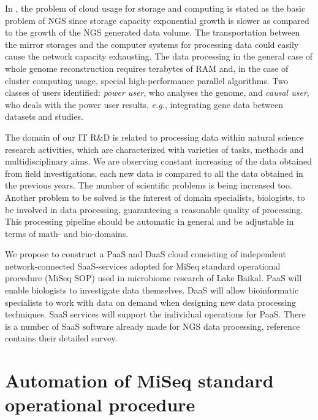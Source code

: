 \documentclass[a4paper]{jpconf}
\begin{document}
In \cite{guo16}, the problem of cloud usage for storage and computing is stated as the basic problem of NGS since storage capacity exponential growth is slower as compared to the growth of the NGS generated data volume. The transportation between the mirror storages and the computer systems for processing data could easily cause the network capacity exhausting. The data processing in the general case of whole genome reconstruction requires terabytes of RAM and, in the case of cluster computing usage, special high-performance parallel algorithms. Two classes of users identified: \emph{power user}, who analyses the genome, and \emph{causal user}, who deals with the power user results, \emph{e.g.}, integrating gene data between datasets and studies.



The domain of our IT R\&D is related to processing data within natural science research activities, which are characterized with varieties of tasks, methods and multidisciplinary aims. %
We are observing constant increasing of the data obtained from field investigations, each new data is compared to all the data obtained in the previous years. The number of scientific problems is being increased too. Another problem to be solved is the interest of domain specialists, biologists, to be involved in data processing, guaranteeing a reasonable quality of processing.  This processing pipeline should be automatic in general and be adjustable in terms of math- and bio-domains.

We propose to construct a PaaS and DaaS cloud consisting of independent network-connected SaaS-services adopted for MiSeq standard operational procedure (MiSeq SOP) used in microbiome research of Lake Baikal. PaaS will enable biologists to investigate data themselves. DaaS will allow bioinformatic specialists to work with data on demand when designing new data processing techniques. SaaS services will support the individual operations for PaaS. There is a number of SaaS software already made for NGS data processing, reference \cite{guo16} contains their detailed survey. %


\section{Automation of MiSeq standard operational procedure}
\label{sec:sop}
\end{document}
